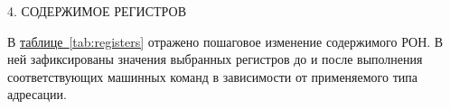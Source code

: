 \begin{center}
    4. СОДЕРЖИМОЕ РЕГИСТРОВ
\end{center}

В \hyperref[tab:registers]{таблице~\ref*{tab:registers}} отражено пошаговое изменение содержимого РОН.
В ней зафиксированы значения выбранных регистров до и после выполнения соответствующих машинных команд в зависимости от применяемого типа адресации.

\begin{table}[ht]
    \caption{Содержимое регистров в зависимости от типов адресации}
    \label{tab:registers}
    \centering
\end{table}

